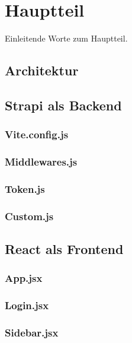 \newpage

\section{Hauptteil} \label{hauptteil}
Einleitende Worte zum Hauptteil.
\subsection{Architektur} \label{architektur}


\subsection{Strapi als Backend} \label{strapiMain}

\subsubsection{Vite.config.js} \label{viteconfigjs}

\subsubsection{Middlewares.js} \label{middlewares}

\subsubsection{Token.js} \label{token}

\subsubsection{Custom.js} \label{custom}


\subsection{React als Frontend} \label{reactFrontend}

\subsubsection{App.jsx} \label{app}

\subsubsection{Login.jsx} \label{login}

\subsubsection{Sidebar.jsx} \label{sidebar}

